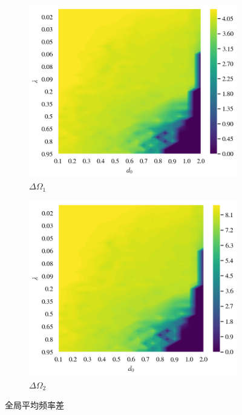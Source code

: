 \documentclass{article}
\begin{document}
\begin{figure}[H]
	\centering
	\begin{subfigure}[b]{0.49\textwidth}
		\includegraphics[width=\textwidth]{./figs/deltaOmega1.png}
		\vspace{-1cm}
		\caption{$\Delta \Omega _1$}
	\end{subfigure}
	\begin{subfigure}[b]{0.49\textwidth}
		\includegraphics[width=\textwidth]{./figs/deltaOmega2.png}
		\vspace{-1cm}
		\caption{$\Delta \Omega _2$}
	\end{subfigure}
	\vspace{-0.5cm}
	\caption{全局平均频率差}
	\label{fig:fig2.5.global}
\end{figure}
\end{document}
